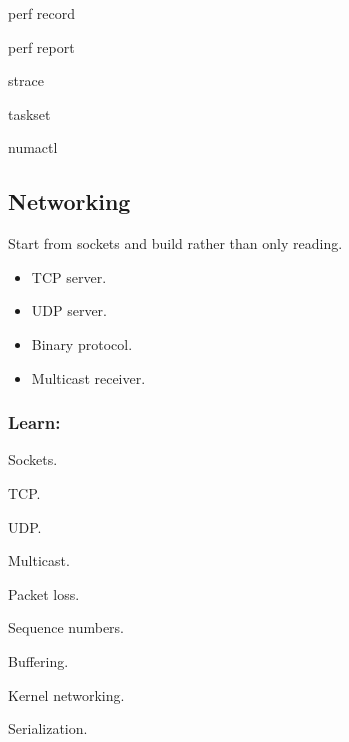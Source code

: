 \documentclass[11pt,letterpaper]{article}
\begin{document}
{\ttfamily\raggedright perf record\par}

{\ttfamily\raggedright perf report\par}

{\ttfamily\raggedright strace\par}

{\ttfamily\raggedright taskset\par}

{\ttfamily\raggedright numactl\par}

\subsection*{Networking}

Start from sockets and build rather than only reading.

\begin{itemize}

\item TCP server.

\item UDP server.

\item Binary protocol.

\item Multicast receiver.

\end{itemize}

\subsubsection*{Learn:}

\begin{topics}

\item Sockets.

\item TCP.

\item UDP.

\item Multicast.

\item Packet loss.

\item Sequence numbers.

\item Buffering.

\item Kernel networking.

\item Serialization.

\end{topics}
\end{document}
